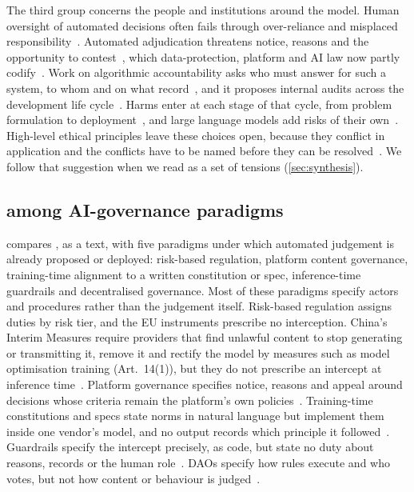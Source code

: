 The third group concerns the people and institutions around the model.
Human oversight of automated decisions often fails through over-reliance and misplaced responsibility~\cite{parasuraman2010complacency,green2022flaws,green2019principles,elish2019moral}.
Automated adjudication threatens notice, reasons and the opportunity to contest~\cite{citron2008technological}, which data-protection, platform and AI law now partly codify~\cite{gdpr2016,dsa2022,euaiact2024,santaclara2021}.
Work on algorithmic accountability asks who must answer for such a system, to whom and on what record~\cite{wieringa2020account}, and it proposes internal audits across the development life cycle~\cite{raji2020closing}.
Harms enter at each stage of that cycle, from problem formulation to deployment~\cite{passi2019problem,suresh2021framework}, and large language models add risks of their own~\cite{bender2021dangers}.
High-level ethical principles leave these choices open, because they conflict in application and the conflicts have to be named before they can be resolved~\cite{whittlestone2019role}.
We follow that suggestion when we read \pol{} as a set of tensions (\cref{sec:synthesis}).

\subsection{\pol{} among AI-governance paradigms}
\label{sec:paradigms}

 compares \pol{}, as a text, with five paradigms under which automated judgement is already proposed or deployed: risk-based regulation, platform content governance, training-time alignment to a written constitution or spec, inference-time guardrails and decentralised governance.
Most of these paradigms specify actors and procedures rather than the judgement itself.
Risk-based regulation assigns duties by risk tier, and the EU instruments prescribe no interception.
China's Interim Measures require providers that find unlawful content to stop generating or transmitting it, remove it and rectify the model by measures such as model optimisation training (Art.~14(1)), but they do not prescribe an intercept at inference time~\cite{euaiact2024,cac2023genai}.
Platform governance specifies notice, reasons and appeal around decisions whose criteria remain the platform's own policies~\cite{dsa2022,santaclara2021}.
Training-time constitutions and specs state norms in natural language but implement them inside one vendor's model, and no output records which principle it followed~\cite{bai2022constitutional,openai2025modelspec}.
Guardrails specify the intercept precisely, as code, but state no duty about reasons, records or the human role~\cite{inan2023llama,rebedea2023nemo}.
DAOs specify how rules execute and who votes, but not how content or behaviour is judged~\cite{buterin2014ethereum,hassan2021decentralized}.

